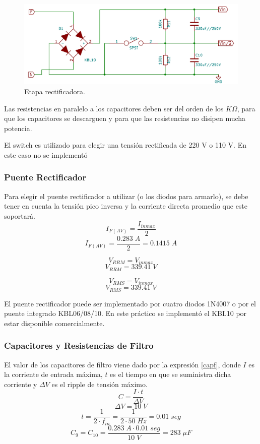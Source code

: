 \documentclass[11pt, a4paper]{article}
\begin{document}
\begin{figure}[h]
	\centering
	\includegraphics[width = 12 cm]{Imagenes/rectificador}
	\caption{Etapa rectificadora.}
	\label{rectificador}
\end{figure}

Las resistencias en paralelo a los capacitores deben ser del orden de los $K\Omega$, para que los capacitores se descarguen y para que las resistencias no disipen mucha potencia.

El switch es utilizado para elegir una tensión rectificada de 220 V o 110 V. En este caso no se implementó

\subsubsection{Puente Rectificador}
Para elegir el puente rectificador a utilizar (o los diodos para armarlo), se debe tener en cuenta la tensión pico inversa y la corriente directa promedio que este soportará.
\begin{equation}
I_{F(AV)} = \frac{I_{inmax}}{2}
\label{IFAV}
\end{equation}
\[ I_{F(AV)} = \frac{0.283 \; A}{2} = 0.1415 \; A \]

\begin{equation}
V_{RRM} = V_{inmax}
\label{VRRM}
\end{equation}
\[ V_{RRM} = 339.41 \; V \]

\begin{equation}
V_{RMS} = V_{inmax}
\label{VRMS}
\end{equation}
\[ V_{RMS} = 339.41 \; V \]

El puente rectificador puede ser implementado por cuatro diodos 1N4007 o por el puente integrado KBL06/08/10. En este práctico se implementó el KBL10 por estar disponible comercialmente.

\subsubsection{Capacitores y Resistencias de Filtro}
El valor de los capacitores de filtro viene dado por la expresión \ref{capf}, donde $I$ es la corriente de entrada máxima, $t$ es el tiempo en que se suministra dicha corriente y $\Delta V$ es el ripple de tensión máximo. 
\begin{equation}
C = \frac{I \cdot t}{\Delta V}
\label{capf}
\end{equation}
\[ \Delta V = 10 \; V \]
\[ t = \frac{1}{2 \cdot f_{in}} = \frac{1}{2 \cdot 50 \; Hz} = 0.01 \; seg\]
\[ C_9 = C_{10} = \frac{0.283 \; A \cdot 0.01 \; seg}{10 \; V} = 283 \; \mu F \]
\end{document}
